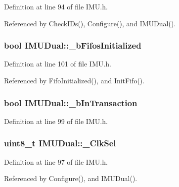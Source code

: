 Definition at line 94 of file IMU.h.



Referenced by CheckIDs(), Configure(), and IMUDual().

\hypertarget{class_i_m_u_dual_ac66a95d57cefcdbe0acbde0f3678de70}{
\subsubsection[{\_\-bFifosInitialized}]{\setlength{\rightskip}{0pt plus 5cm}bool {\bf IMUDual::\_\-bFifosInitialized}}}
\label{class_i_m_u_dual_ac66a95d57cefcdbe0acbde0f3678de70}


Definition at line 101 of file IMU.h.



Referenced by FifoInitialized(), and InitFifo().

\hypertarget{class_i_m_u_dual_ab1fe39075227813321890dfd4dd52335}{
\subsubsection[{\_\-bInTransaction}]{\setlength{\rightskip}{0pt plus 5cm}bool {\bf IMUDual::\_\-bInTransaction}}}
\label{class_i_m_u_dual_ab1fe39075227813321890dfd4dd52335}


Definition at line 99 of file IMU.h.

\hypertarget{class_i_m_u_dual_a4ed556add0ea74046369ce6d8ba46023}{
\subsubsection[{\_\-ClkSel}]{\setlength{\rightskip}{0pt plus 5cm}uint8\_\-t {\bf IMUDual::\_\-ClkSel}}}
\label{class_i_m_u_dual_a4ed556add0ea74046369ce6d8ba46023}


Definition at line 97 of file IMU.h.



Referenced by Configure(), and IMUDual().

